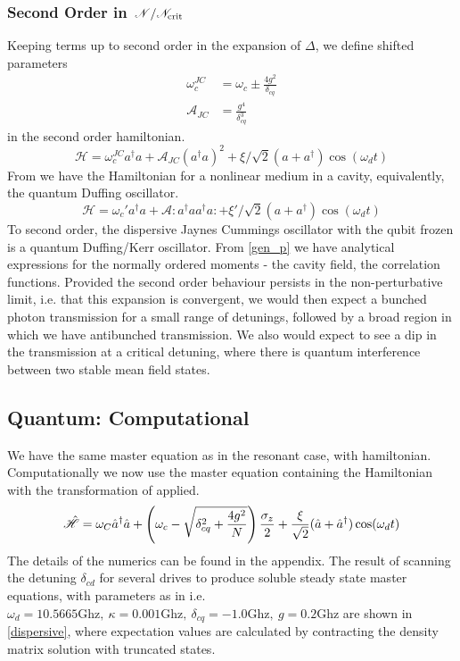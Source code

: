 \subsubsection{Second Order in $\flatfrac{\mathscr{N}}{\mathscr{N}_{\text{crit}}}$}
Keeping terms up to second order in the expansion of $\Delta$, we define shifted parameters
\begin{align*}
    \omega_c^{JC} &= \omega_c \pm \frac{4g^2}{\delta_{cq}}\\
    \mathscr{A}_{JC} &= \frac{g^4}{\delta_{cq}^3}
\end{align*}
in the second order hamiltonian. 
\begin{equation}
    \mathscr{H} = \omega_c^{JC} a ^ \dagger a
    + \mathscr{A}_{JC}\left(a^\dagger a\right)^2
    + \xi/\sqrt{2} ( a + a^\dagger ) \cos(\omega_d t)
\end{equation}
From \cite{Drummond1979} we have the Hamiltonian for a nonlinear medium in a cavity, equivalently, the quantum Duffing oscillator. 
\begin{equation}
    \mathscr{H} = \omega_c' a^\dagger a
    + \mathscr{A} : a ^ \dagger a a ^ \dagger a :
    + \xi'/\sqrt{2}(a+a^\dagger)\cos(\omega_d t)\label{duff}
\end{equation}
To second order, the dispersive Jaynes Cummings oscillator with the qubit frozen is a quantum Duffing/Kerr oscillator. 
From \cref{gen_p} we have analytical expressions for the normally ordered moments - the cavity field, the correlation functions. 
Provided the second order behaviour persists in the non-perturbative limit, i.e. that this expansion is convergent, we would then expect a bunched photon transmission for a small range of detunings, followed by a broad region in which we have antibunched transmission.
We also would expect to see a dip in the transmission at a critical detuning, where there is quantum interference between two stable mean field states.
\subsection{Quantum: Computational}
We have the same master equation as in the resonant case, with hamiltonian. Computationally we now use the master equation containing the Hamiltonian with the transformation of  \cite{Carbonaro1979} applied.
\begin{equation}
  \hat{\mathscr{H}} = \omega_C {\hat{a}^\dagger} \hat{a} + \left(\omega_c - \sqrt{\delta_{cq}^2 + \frac{4g^2}{N}}\right)\frac{\sigma_z}{2} + \frac{\xi}{\sqrt{2}} ( \hat{a} + {\hat{a}^\dagger} ) \cos(\omega_d t) 
\end{equation}
The details of the numerics can be found in the appendix. 
The result of scanning the detuning $\delta_{cd}$ for several drives to produce soluble steady state master equations, with parameters as in \cite{Bishop2010} i.e. $\omega_d = 10.5665\text{Ghz}, \  \kappa = 0.001 \text{Ghz}, \  \delta_{cq} = -1.0 \text{Ghz}, \  g = 0.2\text{Ghz}$ are shown in \cref{dispersive}, where expectation values are calculated by contracting the density matrix solution with truncated states.

